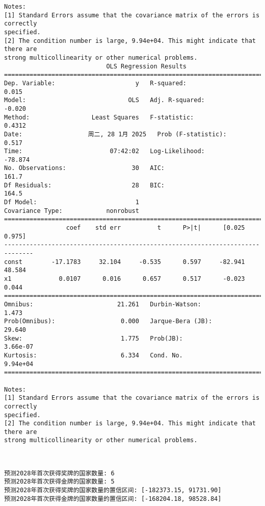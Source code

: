 \documentclass[11pt]{article}
\begin{document}
\begin{Verbatim}[commandchars=\\\{\}]
Notes:
[1] Standard Errors assume that the covariance matrix of the errors is correctly
specified.
[2] The condition number is large, 9.94e+04. This might indicate that there are
strong multicollinearity or other numerical problems.
                            OLS Regression Results
==============================================================================
Dep. Variable:                      y   R-squared:                       0.015
Model:                            OLS   Adj. R-squared:                 -0.020
Method:                 Least Squares   F-statistic:                    0.4312
Date:                  周二, 28 1月 2025   Prob (F-statistic):              0.517
Time:                        07:42:02   Log-Likelihood:                -78.874
No. Observations:                  30   AIC:                             161.7
Df Residuals:                      28   BIC:                             164.5
Df Model:                           1
Covariance Type:            nonrobust
==============================================================================
                 coef    std err          t      P>|t|      [0.025      0.975]
------------------------------------------------------------------------------
const        -17.1783     32.104     -0.535      0.597     -82.941      48.584
x1             0.0107      0.016      0.657      0.517      -0.023       0.044
==============================================================================
Omnibus:                       21.261   Durbin-Watson:                   1.473
Prob(Omnibus):                  0.000   Jarque-Bera (JB):               29.640
Skew:                           1.775   Prob(JB):                     3.66e-07
Kurtosis:                       6.334   Cond. No.                     9.94e+04
==============================================================================

Notes:
[1] Standard Errors assume that the covariance matrix of the errors is correctly
specified.
[2] The condition number is large, 9.94e+04. This might indicate that there are
strong multicollinearity or other numerical problems.
    \end{Verbatim}

    \begin{center}
    \end{center}
    { \hspace*{\fill} \\}
    
    \begin{Verbatim}[commandchars=\\\{\}]
预测2028年首次获得奖牌的国家数量: 6
预测2028年首次获得金牌的国家数量: 5
预测2028年首次获得奖牌的国家数量的置信区间: [-182373.15, 91731.90]
预测2028年首次获得金牌的国家数量的置信区间: [-168204.18, 98528.84]
    \end{Verbatim}
\end{document}
